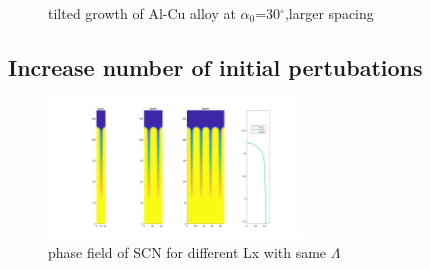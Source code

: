 \documentclass[a4paper,12pt]{article}
\begin{document}
\begin{figure}[!ht]
     \hfill
    
     \caption{tilted growth of Al-Cu alloy at $\alpha_0$=30$^\circ$,larger spacing}
     \label{fig:Ech}
   \end{figure}
   
\subsection{Increase number of initial pertubations}   
\begin{figure}
 \centering
  \includegraphics[width=0.6\textwidth]{./figures/nx20t2_4Lx_conv.png}
  \caption{phase field of SCN for different Lx with same $\Lambda$}
  \label{fig:Lx_conv}
\end{figure}







\end{document}
